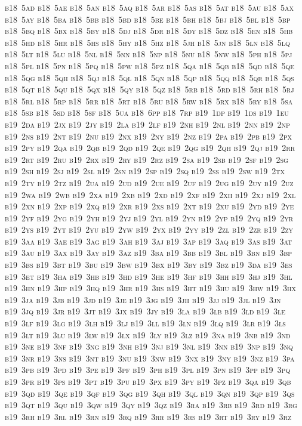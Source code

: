 \documentclass[12pt,a4paper]{article}
\begin{document}
\textsc{\lowercase{%
B18~5AD	B18~5AE	B18~5AN	B18~5AQ	B18~5AR	B18~5AS
B18~5AT	B18~5AU	B18~5AX	B18~5AY	B18~5BA	B18~5BB
B18~5BD	B18~5BE	B18~5BH	B18~5BJ	B18~5BL	B18~5BP
B18~5BQ	B18~5BX	B18~5BY	B18~5DJ	B18~5DR	B18~5DY
B18~5DZ	B18~5EN	B18~5HB	B18~5HD	B18~5HR	B18~5HS
B18~5HY	B18~5HZ	B18~5JH	B18~5JN	B18~5LN	B18~5LQ
B18~5LT	B18~5LU	B18~5NL	B18~5NN	B18~5NP	B18~5NU
B18~5NW	B18~5PH	B18~5PJ	B18~5PL	B18~5PN	B18~5PQ
B18~5PW	B18~5PZ	B18~5QA	B18~5QB	B18~5QD	B18~5QE
B18~5QG	B18~5QH	B18~5QJ	B18~5QL	B18~5QN	B18~5QP
B18~5QQ	B18~5QR	B18~5QS	B18~5QT	B18~5QU	B18~5QX
B18~5QY	B18~5QZ	B18~5RB	B18~5RD	B18~5RH	B18~5RJ
B18~5RL	B18~5RP	B18~5RR	B18~5RT	B18~5RU	B18~5RW
B18~5RX	B18~5RY	B18~5SA	B18~5SB	B18~5SD	B18~5SF
B18~5UA	B18~6PP	B18~7RP	B19~1DP	B19~1DS	B19~1EU
B19~2DA	B19~2JX	B19~2JY	B19~2LA	B19~2LF	B19~2NH
B19~2NL	B19~2NN	B19~2NP	B19~2NS	B19~2NT	B19~2NU
B19~2NX	B19~2NY	B19~2NZ	B19~2PA	B19~2PB	B19~2PX
B19~2PY	B19~2QA	B19~2QB	B19~2QD	B19~2QE	B19~2QG
B19~2QH	B19~2QJ	B19~2RR	B19~2RT	B19~2RU	B19~2RX
B19~2RY	B19~2RZ	B19~2SA	B19~2SB	B19~2SF	B19~2SG
B19~2SH	B19~2SJ	B19~2SL	B19~2SN	B19~2SP	B19~2SQ
B19~2SS	B19~2SW	B19~2TX	B19~2TY	B19~2TZ	B19~2UA
B19~2UD	B19~2UE	B19~2UF	B19~2UG	B19~2UY	B19~2UZ
B19~2WA	B19~2WB	B19~2XA	B19~2XB	B19~2XD	B19~2XF
B19~2XH	B19~2XJ	B19~2XL	B19~2XN	B19~2XP	B19~2XQ
B19~2XR	B19~2XS	B19~2XT	B19~2XU	B19~2YD	B19~2YE
B19~2YF	B19~2YG	B19~2YH	B19~2YJ	B19~2YL	B19~2YN
B19~2YP	B19~2YQ	B19~2YR	B19~2YS	B19~2YT	B19~2YU
B19~2YW	B19~2YX	B19~2YY	B19~2ZL	B19~2ZR	B19~2ZY
B19~3AA	B19~3AE	B19~3AG	B19~3AH	B19~3AJ	B19~3AP
B19~3AQ	B19~3AS	B19~3AT	B19~3AU	B19~3AX	B19~3AY
B19~3AZ	B19~3BA	B19~3BB	B19~3BL	B19~3BN	B19~3BP
B19~3BS	B19~3BT	B19~3BU	B19~3BW	B19~3BX	B19~3BY
B19~3BZ	B19~3DA	B19~3ES	B19~3ET	B19~3HA	B19~3HB
B19~3HD	B19~3HE	B19~3HF	B19~3HH	B19~3HJ	B19~3HL
B19~3HN	B19~3HP	B19~3HQ	B19~3HR	B19~3HS	B19~3HT
B19~3HU	B19~3HW	B19~3HX	B19~3JA	B19~3JB	B19~3JD
B19~3JE	B19~3JG	B19~3JH	B19~3JJ	B19~3JL	B19~3JN
B19~3JQ	B19~3JR	B19~3JT	B19~3JX	B19~3JY	B19~3LA
B19~3LB	B19~3LD	B19~3LE	B19~3LF	B19~3LG	B19~3LH
B19~3LJ	B19~3LL	B19~3LN	B19~3LQ	B19~3LR	B19~3LS
B19~3LT	B19~3LU	B19~3LW	B19~3LX	B19~3LY	B19~3LZ
B19~3NA	B19~3NB	B19~3ND	B19~3NE	B19~3NF	B19~3NG
B19~3NH	B19~3NJ	B19~3NL	B19~3NN	B19~3NP	B19~3NQ
B19~3NR	B19~3NS	B19~3NT	B19~3NU	B19~3NW	B19~3NX
B19~3NY	B19~3NZ	B19~3PA	B19~3PB	B19~3PD	B19~3PE
B19~3PF	B19~3PH	B19~3PL	B19~3PN	B19~3PP	B19~3PQ
B19~3PR	B19~3PS	B19~3PT	B19~3PU	B19~3PX	B19~3PY
B19~3PZ	B19~3QA	B19~3QB	B19~3QD	B19~3QE	B19~3QF
B19~3QG	B19~3QH	B19~3QL	B19~3QN	B19~3QP	B19~3QS
B19~3QT	B19~3QU	B19~3QW	B19~3QY	B19~3QZ	B19~3RA
B19~3RB	B19~3RD	B19~3RG	B19~3RH	B19~3RL	B19~3RN
B19~3RQ	B19~3RR	B19~3RS	B19~3RT	B19~3RY	B19~3RZ
}}
\end{document}
